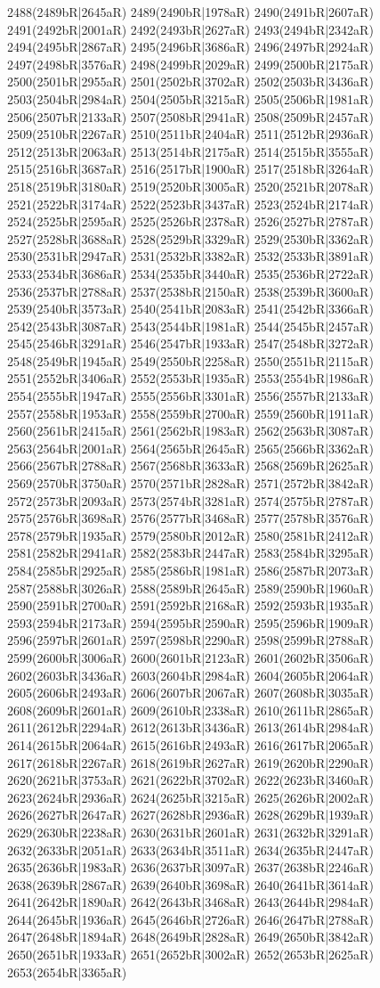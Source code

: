 2488(2489bR|2645aR) 2489(2490bR|1978aR) 2490(2491bR|2607aR) 2491(2492bR|2001aR) 2492(2493bR|2627aR) 2493(2494bR|2342aR) 2494(2495bR|2867aR) 2495(2496bR|3686aR) 2496(2497bR|2924aR) 2497(2498bR|3576aR) 2498(2499bR|2029aR) 2499(2500bR|2175aR) 2500(2501bR|2955aR) 2501(2502bR|3702aR) 2502(2503bR|3436aR) 2503(2504bR|2984aR) 2504(2505bR|3215aR) 2505(2506bR|1981aR) 2506(2507bR|2133aR) 2507(2508bR|2941aR) 2508(2509bR|2457aR) 2509(2510bR|2267aR) 2510(2511bR|2404aR) 2511(2512bR|2936aR) 2512(2513bR|2063aR) 2513(2514bR|2175aR) 2514(2515bR|3555aR) 2515(2516bR|3687aR) 2516(2517bR|1900aR) 2517(2518bR|3264aR) 2518(2519bR|3180aR) 2519(2520bR|3005aR) 2520(2521bR|2078aR) 2521(2522bR|3174aR) 2522(2523bR|3437aR) 2523(2524bR|2174aR) 2524(2525bR|2595aR) 2525(2526bR|2378aR) 2526(2527bR|2787aR) 2527(2528bR|3688aR) 2528(2529bR|3329aR) 2529(2530bR|3362aR) 2530(2531bR|2947aR) 2531(2532bR|3382aR) 2532(2533bR|3891aR) 2533(2534bR|3686aR) 2534(2535bR|3440aR) 2535(2536bR|2722aR) 2536(2537bR|2788aR) 2537(2538bR|2150aR) 2538(2539bR|3600aR) 2539(2540bR|3573aR) 2540(2541bR|2083aR) 2541(2542bR|3366aR) 2542(2543bR|3087aR) 2543(2544bR|1981aR) 2544(2545bR|2457aR) 2545(2546bR|3291aR) 2546(2547bR|1933aR) 2547(2548bR|3272aR) 2548(2549bR|1945aR) 2549(2550bR|2258aR) 2550(2551bR|2115aR) 2551(2552bR|3406aR) 2552(2553bR|1935aR) 2553(2554bR|1986aR) 2554(2555bR|1947aR) 2555(2556bR|3301aR) 2556(2557bR|2133aR) 2557(2558bR|1953aR) 2558(2559bR|2700aR) 2559(2560bR|1911aR) 2560(2561bR|2415aR) 2561(2562bR|1983aR) 2562(2563bR|3087aR) 2563(2564bR|2001aR) 2564(2565bR|2645aR) 2565(2566bR|3362aR) 2566(2567bR|2788aR) 2567(2568bR|3633aR) 2568(2569bR|2625aR) 2569(2570bR|3750aR) 2570(2571bR|2828aR) 2571(2572bR|3842aR) 2572(2573bR|2093aR) 2573(2574bR|3281aR) 2574(2575bR|2787aR) 2575(2576bR|3698aR) 2576(2577bR|3468aR) 2577(2578bR|3576aR) 2578(2579bR|1935aR) 2579(2580bR|2012aR) 2580(2581bR|2412aR) 2581(2582bR|2941aR) 2582(2583bR|2447aR) 2583(2584bR|3295aR) 2584(2585bR|2925aR) 2585(2586bR|1981aR) 2586(2587bR|2073aR) 2587(2588bR|3026aR) 2588(2589bR|2645aR) 2589(2590bR|1960aR) 2590(2591bR|2700aR) 2591(2592bR|2168aR) 2592(2593bR|1935aR) 2593(2594bR|2173aR) 2594(2595bR|2590aR) 2595(2596bR|1909aR) 2596(2597bR|2601aR) 2597(2598bR|2290aR) 2598(2599bR|2788aR) 2599(2600bR|3006aR) 2600(2601bR|2123aR) 2601(2602bR|3506aR) 2602(2603bR|3436aR) 2603(2604bR|2984aR) 2604(2605bR|2064aR) 2605(2606bR|2493aR) 2606(2607bR|2067aR) 2607(2608bR|3035aR) 2608(2609bR|2601aR) 2609(2610bR|2338aR) 2610(2611bR|2865aR) 2611(2612bR|2294aR) 2612(2613bR|3436aR) 2613(2614bR|2984aR) 2614(2615bR|2064aR) 2615(2616bR|2493aR) 2616(2617bR|2065aR) 2617(2618bR|2267aR) 2618(2619bR|2627aR) 2619(2620bR|2290aR) 2620(2621bR|3753aR) 2621(2622bR|3702aR) 2622(2623bR|3460aR) 2623(2624bR|2936aR) 2624(2625bR|3215aR) 2625(2626bR|2002aR) 2626(2627bR|2647aR) 2627(2628bR|2936aR) 2628(2629bR|1939aR) 2629(2630bR|2238aR) 2630(2631bR|2601aR) 2631(2632bR|3291aR) 2632(2633bR|2051aR) 2633(2634bR|3511aR) 2634(2635bR|2447aR) 2635(2636bR|1983aR) 2636(2637bR|3097aR) 2637(2638bR|2246aR) 2638(2639bR|2867aR) 2639(2640bR|3698aR) 2640(2641bR|3614aR) 2641(2642bR|1890aR) 2642(2643bR|3468aR) 2643(2644bR|2984aR) 2644(2645bR|1936aR) 2645(2646bR|2726aR) 2646(2647bR|2788aR) 2647(2648bR|1894aR) 2648(2649bR|2828aR) 2649(2650bR|3842aR) 2650(2651bR|1933aR) 2651(2652bR|3002aR) 2652(2653bR|2625aR) 2653(2654bR|3365aR) 